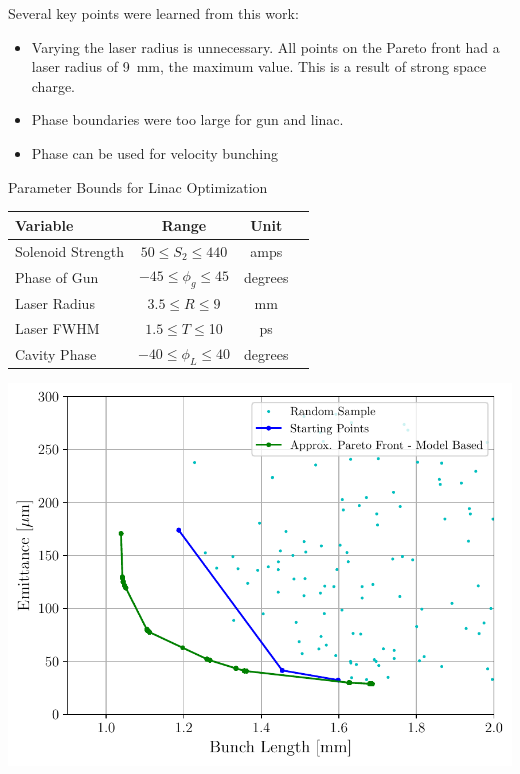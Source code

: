 \documentclass[portrait,final,paperwidth=92cm, paperheight=152cm,  fontscale=0.277]{baposter}
\begin{document}
\begin{poster}
{\begin{center}
\begin{minipage}{0.5\textwidth}
Several key points were learned from this work:
\begin{itemize}
	\itemsep0em
	\item Varying the laser radius is unnecessary. 
	All points on the Pareto front	had a laser radius of \SI{9}{mm}, the maximum value. This is a result of strong space charge.
	\item Phase boundaries were too large for gun and linac.
	\item Phase can be used for velocity bunching	
\end{itemize}
		
\vspace{3em}
		\begin{singlespace}
			\centering
			
			Parameter Bounds for Linac Optimization
			
			\begin{tabular}{ l *{3}{c}}
				\hline%
				\textbf{Variable} & \textbf{Range} & \textbf{Unit} \\
				\hline%
				Solenoid Strength & $ 50 \le S_2 \le 440$  & amps \\
				Phase of Gun & $-45 \le \phi_g \le 45$  & degrees \\
				Laser Radius  & $3.5 \le R \le 9$  & mm \\
				Laser FWHM & $1.5 \le T \le $10  & ps \\
				Cavity Phase & $-40 \le \phi_L \le 40$  & degrees \\
				\hline%
			\end{tabular}
		\end{singlespace}
	\end{minipage}\hspace{1em}
	\begin{minipage}{0.48\textwidth}
		\centering
		\includegraphics[width=1\textwidth]{THPMF049f2}
		

\end{minipage}
\end{center}}
\end{poster}
\end{document}
